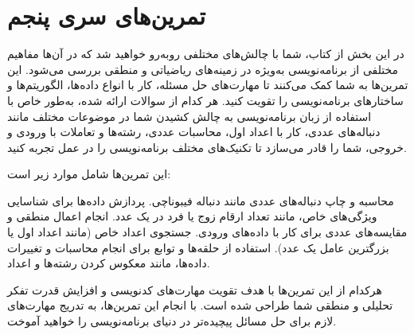 \documentclass[b5paper,12pt]{article}
\begin{document}
	\newpage
	\section*{تمرین‌های سری پنجم}
	در این بخش از کتاب، شما با چالش‌های مختلفی روبه‌رو خواهید شد که در آن‌ها مفاهیم مختلفی از برنامه‌نویسی به‌ویژه در زمینه‌های ریاضیاتی و منطقی بررسی می‌شود. این تمرین‌ها به شما کمک می‌کنند تا مهارت‌های حل مسئله، کار با انواع داده‌ها، الگوریتم‌ها و ساختارهای برنامه‌نویسی را تقویت کنید. هر کدام از سوالات ارائه شده، به‌طور خاص با استفاده از زبان برنامه‌نویسی به چالش کشیدن شما در موضوعات مختلف مانند دنباله‌های عددی، کار با اعداد اول، محاسبات عددی، رشته‌ها و تعاملات با ورودی و خروجی، شما را قادر می‌سازد تا تکنیک‌های مختلف برنامه‌نویسی را در عمل تجربه کنید.

	این تمرین‌ها شامل موارد زیر است:

	محاسبه و چاپ دنباله‌های عددی مانند دنباله فیبوناچی.
	پردازش داده‌ها برای شناسایی ویژگی‌های خاص، مانند تعداد ارقام زوج یا فرد در یک عدد.
	انجام اعمال منطقی و مقایسه‌های عددی برای کار با داده‌های ورودی.
	جستجوی اعداد خاص (مانند اعداد اول یا بزرگترین عامل یک عدد).
	استفاده از حلقه‌ها و توابع برای انجام محاسبات و تغییرات داده‌ها، مانند معکوس کردن رشته‌ها و اعداد.

	هرکدام از این تمرین‌ها با هدف تقویت مهارت‌های کدنویسی و افزایش قدرت تفکر تحلیلی و منطقی شما طراحی شده است. با انجام این تمرین‌ها، به تدریج مهارت‌های لازم برای حل مسائل پیچیده‌تر در دنیای برنامه‌نویسی را خواهید آموخت.
	
\end{document}
